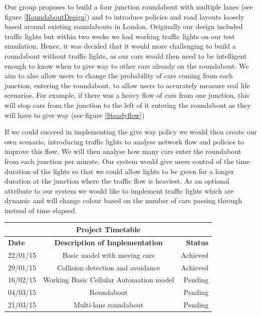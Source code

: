 \documentclass[11pt]{article}
\begin{document}
	Our group proposes to build a four junction roundabout with multiple lanes (see figure \ref{RoundaboutDesign}) and to introduce policies and road layouts loosely based around existing roundabouts in London.
	 Originally our design included traffic lights but within two weeks we had working traffic lights on our test simulation.
	  Hence, it was decided that it would more challenging to build a roundabout without traffic lights, as our cars would then need to be intelligent enough to know when to give way to other cars already on the roundabout. 
	  We aim to also allow users to change the probability of cars coming from each junction, entering the roundabout, to allow users to accurately measure real life scenarios.
	   For example, if there was a heavy flow of cars from one junction, this will stop cars from the junction to the left of it entering the roundabout as they will have to give way (see figure \ref{Steadyflow})

	
	If we could succeed in implementing the give way policy we would then create our own scenario, introducing traffic lights to analyse network flow and policies to improve this flow. 
	We will then analyse how many cars enter the roundabout from each junction per minute. 
	Our system would give users control of the time duration of the lights so that we could allow lights to be green for a longer duration at the junction where the traffic flow is heaviest. 
	As an optional attribute to our system we would like to implement traffic lights which are dynamic and will change colour based on the number of cars passing through instead of time elapsed. \\
	
	\begin{tabular}{ | l | c | r | }
		\hline
		\multicolumn{3}{|c|}{\bf{Project Timetable}}  \\ \hline
		\bf{Date} & \bf{Description of Implementation} & \bf{Status} \\ \hline
		22/01/15 & Basic model with moving cars &  Achieved \\ \hline
		29/01/15 & Collision detection and avoidance & Achieved \\ \hline
		16/02/15 & Working Basic Cellular Automation model & Pending \\ \hline
		04/03/15 & Roundabout & Pending \\ \hline
		21/03/15 & Multi-lane roundabout & Pending \\ \hline
		
	\end{tabular}\\\\
\end{document}

